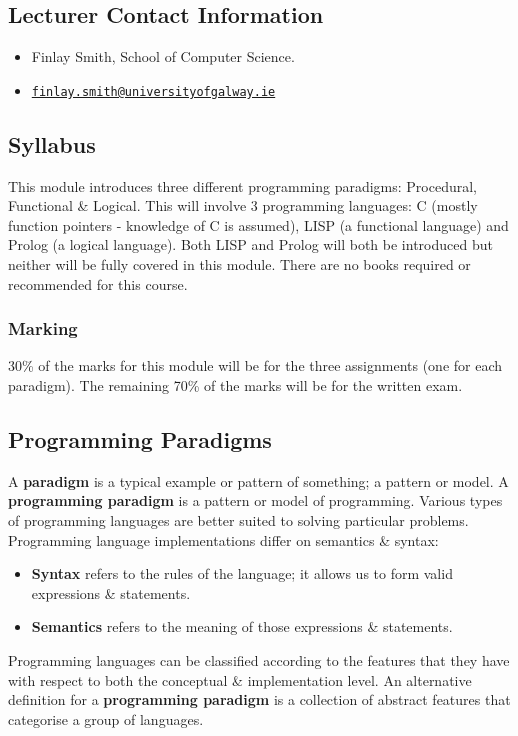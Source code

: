 \documentclass[a4paper,11pt]{article}
\begin{document}
\subsection{Lecturer Contact Information}
\begin{itemize}
    \item   Finlay Smith, School of Computer Science. 
    \item   \href{mailto://finlay.smith@universityofgalway.ie}{\texttt{finlay.smith@universityofgalway.ie}}
\end{itemize}

\subsection{Syllabus}
This module introduces three different programming paradigms: Procedural, Functional \& Logical.
This will involve 3 programming languages: C (mostly function pointers - knowledge of C is assumed), LISP
(a functional language) and Prolog (a logical language).
Both LISP and Prolog will both be introduced but neither will be fully covered in this module.
There are no books required or recommended for this course. 

\subsubsection{Marking}
30\% of the marks for this module will be for the three assignments (one for each paradigm).
The remaining 70\% of the marks will be for the written exam.

\subsection{Programming Paradigms}
A \textbf{paradigm} is a typical example or pattern of something; a pattern or model. 
A \textbf{programming paradigm} is a pattern or model of programming.
Various types of programming languages are better suited to solving particular problems.
Programming language implementations  differ on semantics \& syntax:
\begin{itemize}
    \item   \textbf{Syntax} refers to the rules of the language; it allows us to form valid expressions \& statements.
    \item   \textbf{Semantics} refers to the meaning of those expressions \& statements.
\end{itemize}

Programming languages can be classified according to the features that they have with respect to both the conceptual \& implementation 
level.
An alternative definition for a \textbf{programming paradigm} is a collection of abstract features that categorise a group of 
languages.
\end{document}
